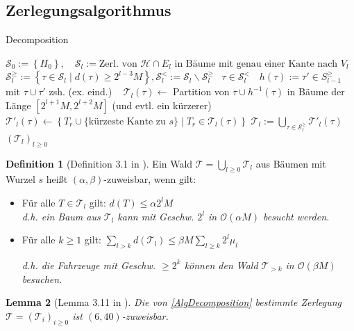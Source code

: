 \documentclass[a4paper,ngerman,12pt,bibtotoc]{scrartcl}
\newcommand{\LineFor}[2]{\State\algorithmicfor\ {#1}\ \algorithmicdo\ {#2} \algorithmicend\ \algorithmicfor}
\theoremstyle{definition}
\newtheorem{defn}{Definition}[section]
\theoremstyle{plain}
\newtheorem{lemma}[defn]{Lemma}
\theoremstyle{remark}
\newcommand{\Hc}{\mathcal{H}}
\newcommand{\Tc}{\mathcal{T}}
\newcommand{\Sc}{\mathcal{S}}
\newcommand{\Oc}{\mathcal{O}}
\begin{document}
	\subsection{Zerlegungsalgorithmus}
	
	\begin{algorithm}[H]
		\caption{Decomposition}\label{AlgDecomposition}
		\begin{algorithmic}[1]
			\Procedure{Decomposition}{$\left(\Hc\right)$}
			\State $\Sc_0 := \left\lbrace H_0 \right\rbrace,\quad \Sc_l := \text{Zerl. von } \Hc\cap E_l \text{ in Bäume mit genau einer Kante nach } V_l$
			\State $\Sc_l^{\geq} := \left\{\tau \in \Sc_l \mid d(\tau) \geq 2^{l-3}M\right\}, \Sc_l^< := \Sc_l \backslash \Sc_l^{\geq}$
			\LineFor{$\tau \in \Sc_l^{<}$}{$h(\tau) := \tau' \in S_{l-1}^{\geq}$ mit $\tau \cup \tau'$ zsh. (ex. eind.)}
			\For{$\tau \in \Sc_l^{\geq}$}
				\State $\Tc_l(\tau) \gets$ Partition von $\tau \cup h^{-1}(\tau)$ in Bäume der Länge $\left[2^{l+1}M, 2^{l+2}M\right]$ 
				\Statex \hspace{6.5em} (und evtl. ein kürzerer)
				\State $\Tc'_l(\tau) \gets \left\{T_r \cup \{\text{kürzeste Kante zu } s\} \mid T_r \in \Tc_l(\tau)\right\}$
			\EndFor
			\State $\Tc_l := \bigcup_{\tau \in \Sc_l^{\geq}}\Tc'_l(\tau)$
			\State \Return $\left(\Tc_l\right)_{l\geq 0}$
			\EndProcedure
		\end{algorithmic}
	\end{algorithm}
	
	\begin{defn}[Definition 3.1 in \cite{HetCVRP}]
		Ein Wald $\Tc = \bigcup_{l\geq 0} \Tc_l$ aus Bäumen mit Wurzel $s$ heißt $(\alpha, \beta)$-zuweisbar, wenn gilt:
		\begin{itemize}
			\item Für alle $T \in \Tc_l$ gilt: $d(T) \leq \alpha 2^l M$ \\
			\textit{d.h. ein Baum aus $\Tc_l$ kann mit Geschw. $2^l$ in $\Oc(\alpha M)$ besucht werden.}
			\item Für alle $k \geq 1$ gilt: $\sum_{l > k} d(\Tc_l) \leq \beta M \sum_{l\geq k} 2^l\mu_l$
			
			\textit{d.h. die Fahrzeuge mit Geschw. $\geq 2^k$ können den Wald $\Tc_{>k}$ in $\Oc(\beta M)$ besuchen.}
		\end{itemize}
	\end{defn}
	
	\begin{lemma}[Lemma 3.11 in \cite{HetCVRP}]
		Die von \cref{AlgDecomposition} bestimmte Zerlegung $\Tc = (\Tc_i)_{i\geq 0}$ ist $(6, 40)$-zuweisbar.
	\end{lemma}
	
\end{document}
